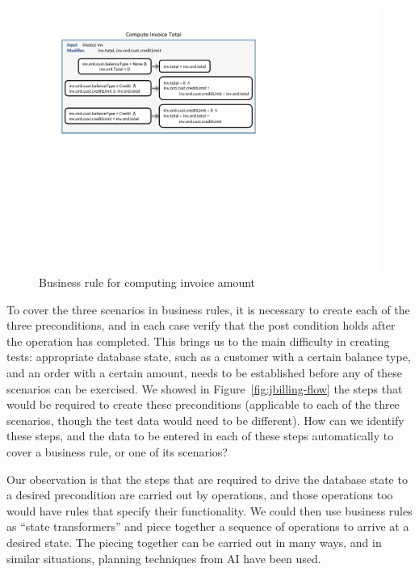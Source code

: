 \begin{figure}
\centering
\includegraphics[trim=30 300 270 0,clip,width=\columnwidth]{figs/invoice}
\caption{Business rule for computing invoice amount}
\label{fig:invoice}
\end{figure}

To cover the three scenarios in business rules, it is necessary to create each of the three preconditions,
and in each case verify that the post condition holds after the operation has completed.  This brings us to the 
main difficulty in creating tests:  appropriate database state, such as a customer with a certain balance type,
and an order with a certain amount, needs to be established before any of these scenarios can be exercised.  
We showed in Figure~\ref{fig:jbilling-flow} the steps that would be required to create these preconditions 
(applicable to each of the three scenarios, though the test data would need to be different).   How can we
identify these steps, and the data to be entered in each of these steps automatically to cover a business rule, or
one of its scenarios?

Our observation is that the steps that are required to drive the database state to a desired precondition are
carried out by operations, and those operations too would have rules that specify their functionality.  We could
then use business rules as ``state transformers'' and piece together a sequence of operations to arrive at
a desired state.  The piecing together can be carried out in many ways, and in similar situations, planning
techniques from AI have been used.  

